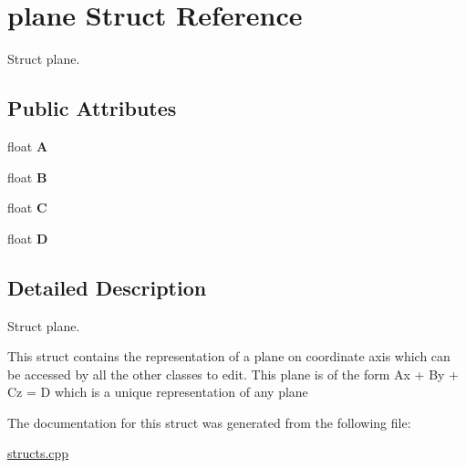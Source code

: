 \hypertarget{structplane}{}\section{plane Struct Reference}
\label{structplane}


Struct plane.  


\subsection*{Public Attributes}
\begin{DoxyCompactItemize}
\item 
float {\bfseries A}\hypertarget{structplane_a7cbe59df743ed3cf5b914b94e5d8ae52}{}\label{structplane_a7cbe59df743ed3cf5b914b94e5d8ae52}

\item 
float {\bfseries B}\hypertarget{structplane_a03abeea8dacf60d86309aa336269906f}{}\label{structplane_a03abeea8dacf60d86309aa336269906f}

\item 
float {\bfseries C}\hypertarget{structplane_a88b564304a3acb0f68186e2ea71a0cdc}{}\label{structplane_a88b564304a3acb0f68186e2ea71a0cdc}

\item 
float {\bfseries D}\hypertarget{structplane_a3c9cd28e6ff7feccc4deee7678d9f8f9}{}\label{structplane_a3c9cd28e6ff7feccc4deee7678d9f8f9}

\end{DoxyCompactItemize}


\subsection{Detailed Description}
Struct plane. 

This struct contains the representation of a plane on coordinate axis which can be accessed by all the other classes to edit. This plane is of the form Ax + By + Cz = D which is a unique representation of any plane 

The documentation for this struct was generated from the following file\+:\begin{DoxyCompactItemize}
\item 
\hyperlink{structs_8cpp}{structs.\+cpp}\end{DoxyCompactItemize}
